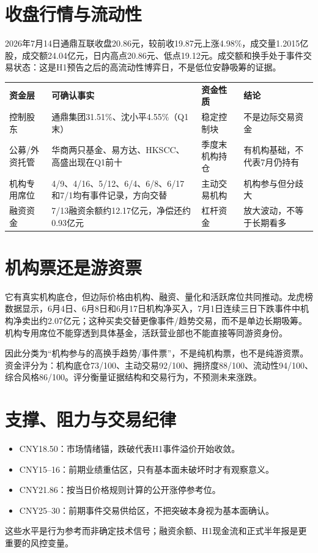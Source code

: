 \section{收盘行情与流动性}
2026年7月14日通鼎互联收盘20.86元，较前收19.87元上涨4.98\%，成交量1.2015亿股，成交额24.04亿元，日内高点20.86元、低点19.12元。成交额和换手处于事件交易状态：这是H1预告之后的高流动性博弈日，不是低位安静吸筹的证据。

\begin{exhibitbox}
\begin{tabularx}{\exhibitboxwidth}{L{2.7cm}X L{2.9cm}X}
\textbf{资金层} & \textbf{可确认事实} & \textbf{资金性质} & \textbf{结论} \\
控制股东 & 通鼎集团31.51\%、沈小平4.55\%（Q1末） & 稳定控制块 & 不是边际交易资金 \\
公募/外资托管 & 华商两只基金、易方达、HKSCC、高盛出现在Q1前十 & 季度末机构持仓 & 有机构基础，不代表7月仍持有 \\
机构专用席位 & 4/9、4/16、5/12、6/4、6/8、6/17和7/1均有事件记录，方向交替 & 主动交易机构 & 机构参与但分歧大 \\
融资资金 & 7/13融资余额约12.17亿元，净偿还约0.93亿元 & 杠杆资金 & 放大波动，不等于长期看多 \\
\end{tabularx}
\end{exhibitbox}

\section{机构票还是游资票}
它有真实机构底仓，但边际价格由机构、融资、量化和活跃席位共同推动。龙虎榜数据显示，6月4日、6月8日和6月17日机构净买入，7月1日连续三日下跌事件中机构净卖出约2.07亿元；这种买卖交替更像事件/趋势交易，而不是单边长期吸筹。机构专用席位不能穿透到具体基金，活跃营业部也不能直接等同游资身份。

因此分类为“机构参与的高换手趋势/事件票”，不是纯机构票，也不是纯游资票。资金评分为：机构底仓73/100、主动交易92/100、拥挤度88/100、流动性94/100、综合风格86/100。评分衡量证据结构和交易行为，不预测未来涨跌。

\section{支撑、阻力与交易纪律}
\begin{itemize}
\item CNY18.50：市场情绪锚，跌破代表H1事件溢价开始收敛。
\item CNY15--16：前期业绩重估区，只有基本面未破坏时才有观察意义。
\item CNY21.86：按当日价格规则计算的公开涨停参考位。
\item CNY25--30：前期事件交易供给区，不把突破本身视为基本面确认。
\end{itemize}
这些水平是行为参考而非确定技术信号；融资余额、H1现金流和正式半年报是更重要的风控变量。
